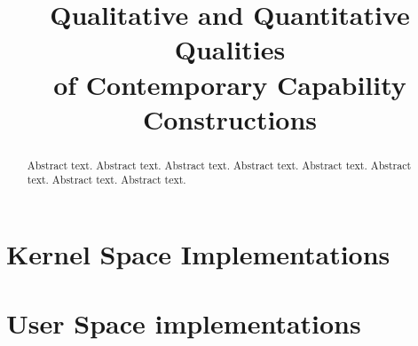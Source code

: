 \documentclass[conference]{IEEEtran}
\begin{document}
\title{Qualitative and Quantitative Qualities \\ of Contemporary Capability Constructions}

\author{
  \and
  \and
}

\date{}


\maketitle
\begin{abstract}
Abstract text. Abstract text. Abstract text. Abstract text. Abstract text. Abstract text. Abstract text. Abstract text.
\end{abstract}

	

\section{Kernel Space Implementations}
 
 


\hfill
\section{User Space implementations}
	
	










\end{document}
